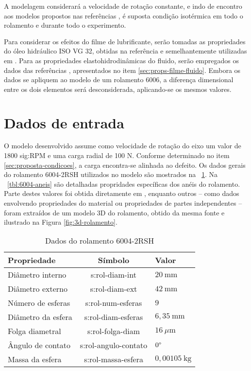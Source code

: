 \documentclass[12pt,oneside,english,brazil,lmodern,siglas,simbolos,cite=num]{ucsmonograph}
\begin{document}
	A modelagem considerará a velocidade de rotação constante, e indo de encontro aos modelos propostos nas referências \cite{mcfadden:1984,sassi:2007,patil:2010,cong:2013,tandon:1997}, é suposta condição isotérmica em todo o rolamento e durante todo o experimento.
	
	Para considerar os efeitos do filme de lubrificante, serão tomadas as propriedades do óleo hidráulico ISO VG 32, obtidas na referência \cite{iso-vg32} e semelhantemente utilizadas em \cite{nonato:2014}.
	Para as propriedades elastohidrodinâmicas do fluido, serão empregados os dados das referências \cite{roelands:1966,nonato:2014}, apresentados no item \ref{sec:props-filme-fluido}.
	Embora os dados se apliquem ao modelo de um rolamento 6006, a diferença dimensional entre os dois elementos será desconsiderada, aplicando-se os mesmos valores.
	
	\section{Dados de entrada} \label{sec:dados-entrada}
	O modelo desenvolvido assume como velocidade de rotação do eixo um valor de 1800 \gls{sig:RPM} e uma carga radial de 100 N.
	Conforme determinado no item \ref{sec:proposta-condicoes}, a carga encontra-se alinhada ao defeito.
	Os dados gerais do rolamento 6004-2RSH utilizados no modelo são mostrados na \tablename\ \ref{tbl:6004-gerais}.
	Na \tablename\ \ref{tbl:6004-aneis} são detalhadas propridades específicas dos anéis do rolamento.
	Parte destes valores foi obtida diretamente em \cite{skf6004}, enquanto outros -- como dados envolvendo propriedades do material ou propriedades de partes independentes -- foram extraídos de um modelo 3D do rolamento, obtido da mesma fonte e ilustrado na Figura \ref{fig:3d-rolamento}.
	
	\begin{table}[t]
	\caption{Dados do rolamento 6004-2RSH}
	\def\arraystretch{1.2}
	\centering
	\begin{tabular}{l|c|l}
	\toprule
	\textbf{Propriedade} & \textbf{Símbolo} & \textbf{Valor} \\\midrule
	Diâmetro interno & \gls{s:rol-diam-int} & $20\ \text{mm}$ \\
	Diâmetro externo & \gls{s:rol-diam-ext} & $42\ \text{mm}$ \\
	Número de esferas & \gls{s:rol-num-esferas} & $ 9 $\\
	Diâmetro da esfera & \gls{s:rol-diam-esferas} & $6,35\ \text{mm}$ \\
	Folga diametral & \gls{s:rol-folga-diam} & $ 16\ \mu\text{m} $ \\
	Ângulo de contato & \gls{s:rol-angulo-contato} & $ 0\text\textdegree$\\
	Massa da esfera & \gls{s:rol-massa-esfera} & $ 0,00105\ \text{kg} $
	\\\bottomrule
	\end{tabular}
	\label{tbl:6004-gerais}
	\end{table}
\end{document}
